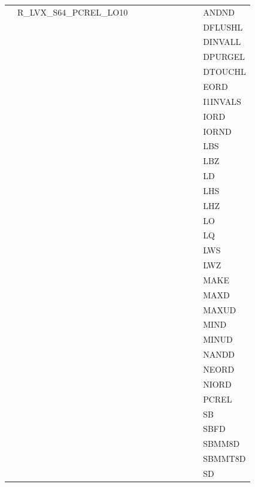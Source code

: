 {\begin{tabular}{|l|l|l|l|l|l|l|l|l|l|l|}
 & \textsf{R\_LVX\_S64\_PCREL\_LO10} & & & & & & & & & \textsf{ANDND} \\
 & & & & & & & & & & \textsf{DFLUSHL} \\
 & & & & & & & & & & \textsf{DINVALL} \\
 & & & & & & & & & & \textsf{DPURGEL} \\
 & & & & & & & & & & \textsf{DTOUCHL} \\
 & & & & & & & & & & \textsf{EORD} \\
 & & & & & & & & & & \textsf{I1INVALS} \\
 & & & & & & & & & & \textsf{IORD} \\
 & & & & & & & & & & \textsf{IORND} \\
 & & & & & & & & & & \textsf{LBS} \\
 & & & & & & & & & & \textsf{LBZ} \\
 & & & & & & & & & & \textsf{LD} \\
 & & & & & & & & & & \textsf{LHS} \\
 & & & & & & & & & & \textsf{LHZ} \\
 & & & & & & & & & & \textsf{LO} \\
 & & & & & & & & & & \textsf{LQ} \\
 & & & & & & & & & & \textsf{LWS} \\
 & & & & & & & & & & \textsf{LWZ} \\
 & & & & & & & & & & \textsf{MAKE} \\
 & & & & & & & & & & \textsf{MAXD} \\
 & & & & & & & & & & \textsf{MAXUD} \\
 & & & & & & & & & & \textsf{MIND} \\
 & & & & & & & & & & \textsf{MINUD} \\
 & & & & & & & & & & \textsf{NANDD} \\
 & & & & & & & & & & \textsf{NEORD} \\
 & & & & & & & & & & \textsf{NIORD} \\
 & & & & & & & & & & \textsf{PCREL} \\
 & & & & & & & & & & \textsf{SB} \\
 & & & & & & & & & & \textsf{SBFD} \\
 & & & & & & & & & & \textsf{SBMM8D} \\
 & & & & & & & & & & \textsf{SBMMT8D} \\
 & & & & & & & & & & \textsf{SD} \\
\hline\end{tabular}
}
\smallskip

